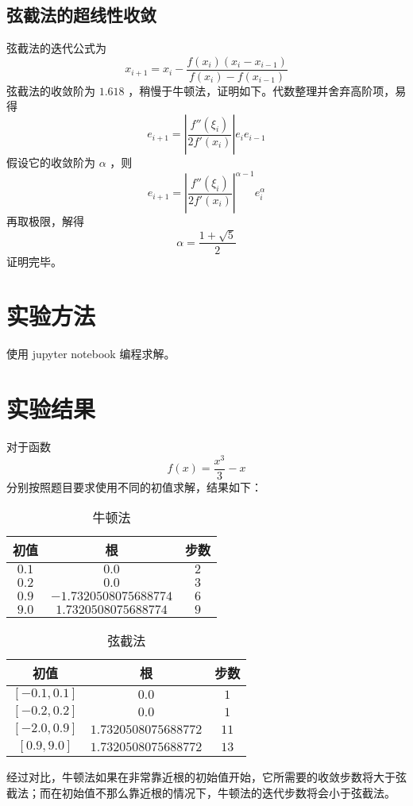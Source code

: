 \documentclass[12pt]{ctexart}
\numberwithin{equation}{section}
\begin{document}
\subsection{弦截法的超线性收敛}
弦截法的迭代公式为
\begin{equation}\label{equ:secant}
    x_{i+1} = x_i - \frac{f(x_i)(x_i - x_{i-1})}{f(x_i) - f(x_{i-1})} 
\end{equation}
弦截法的收敛阶为 $1.618$ ，稍慢于牛顿法，证明如下。代数整理并舍弃高阶项，易得
\[
    e_{i+1} = \left|\frac{f''(\xi_i)}{2f'(x_i)} \right| e_ie_{i-1}
\]
假设它的收敛阶为 $\alpha$ ，则
\[
    e_{i+1} = \left|\frac{f''(\xi_i)}{2f'(x_i)} \right|^{\alpha -1} e_i^\alpha 
\]
再取极限，解得
\[
    \alpha = \frac{1 + \sqrt{5}}{2} 
\]
证明完毕。

\section{实验方法}
使用 jupyter notebook 编程求解。

\section{实验结果}
对于函数
\[
    f(x) = \frac{x^3}{3} - x
\]
分别按照题目要求使用不同的初值求解，结果如下：


\begin{longtable}{ccc}
    \caption{牛顿法} \\
        \hline
        初值 & 根 & 步数 \\
        \hline
        $0.1$ & $0.0$ & $2$\\
         $0.2$ & $0.0$ 	&  $3$\\
	    $0.9$ &  $-1.7320508075688774$ &  $6$\\
	    $9.0$ &  $1.7320508075688774 $&  $9$
\end{longtable}

\begin{longtable}{ccc}
    \caption{弦截法} \\
        \hline
        初值 & 根 & 步数 \\
        \hline
        $[-0.1, 0.1]$ 	&  $0.0$ 	&  $1$ \\
	    $[-0.2, 0.2]$ 	&  $0.0$ 	&  $1$ \\
	    $[-2.0, 0.9]$ 	&  $1.7320508075688772 $ 	&  $11$ \\
	    $[0.9, 9.0]$ 	&  $1.7320508075688772 $ 	&  $13$
\end{longtable}

经过对比，牛顿法如果在非常靠近根的初始值开始，它所需要的收敛步数将大于弦截法；而在初始值不那么靠近根的情况下，牛顿法的迭代步数将会小于弦截法。
\end{document}

